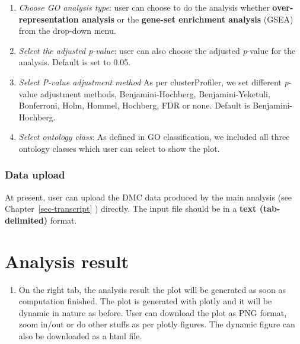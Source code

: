 \documentclass[
  a4paper,
  DIV=11,
  numbers=noendperiod,
  oneside,
  open=any]{scrreport}
\providecommand{\tightlist}{%
  \setlength{\itemsep}{0pt}\setlength{\parskip}{0pt}}\usepackage{longtable,booktabs,array}
\begin{document}
\begin{enumerate}
\def\labelenumi{\arabic{enumi}.}
\tightlist
\item
  \emph{Choose GO analysis type}: user can choose to do the analysis
  whether \textbf{over-representation analysis} or the \textbf{gene-set
  enrichment analysis} (GSEA) from the drop-down menu.
\item
  \emph{Select the adjusted p-value}: user can also choose the adjusted
  \emph{p}-value for the analysis. Default is set to 0.05.
\item
  \emph{Select P-value adjustment method} As per clusterProfiler, we set
  different \emph{p}-value adjustment methods, Benjamini-Hochberg,
  Benjamini-Yeketuli, Bonferroni, Holm, Hommel, Hochberg, FDR or none.
  Default is Benjamini-Hochberg.
\item
  \emph{Select ontology class}: As defined in GO classification, we
  included all three ontology classes which user can select to show the
  plot.
\end{enumerate}

\subsubsection{Data upload}\label{data-upload-3}

At present, user can upload the DMC data produced by the main analysis
(see Chapter~\ref{sec-transcript} ) directly. The input file should be
in a \textbf{text (tab-delimited)} format.

\section{Analysis result}\label{analysis-result-3}

\begin{enumerate}
\def\labelenumi{\arabic{enumi}.}
\tightlist
\item
  On the right tab, the analysis result the plot will be generated as
  soon as computation finished. The plot is generated with plotly and it
  will be dynamic in nature as before. User can download the plot as PNG
  format, zoom in/out or do other stuffs as per plotly figures. The
  dynamic figure can also be downloaded as a html file.
\end{enumerate}
\end{document}
